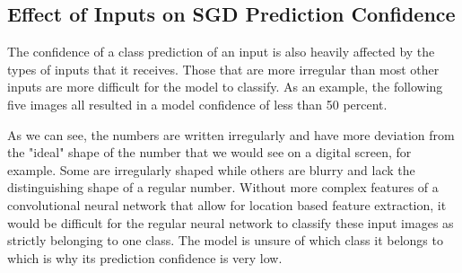 \documentclass[11pt,letterpaper,titlepage]{article}
\begin{document}
	\subsection{Effect of Inputs on SGD Prediction Confidence}
	The confidence of a class prediction of an input is also heavily affected by the types of inputs that it receives. Those that are more irregular than most other inputs are more difficult for the model to classify. As an example, the following five images all resulted in a model confidence of less than 50 percent.
	
	As we can see, the numbers are written irregularly and have more deviation from the "ideal" shape of the number that we would see on a digital screen, for example. Some are irregularly shaped while others are blurry and lack the distinguishing shape of a regular number. Without more complex features of a convolutional neural network that allow for location based feature extraction, it would be difficult for the regular neural network to classify these input images as strictly belonging to one class. The model is unsure of which class it belongs to which is why its prediction confidence is very low.
	
	
\end{document}
